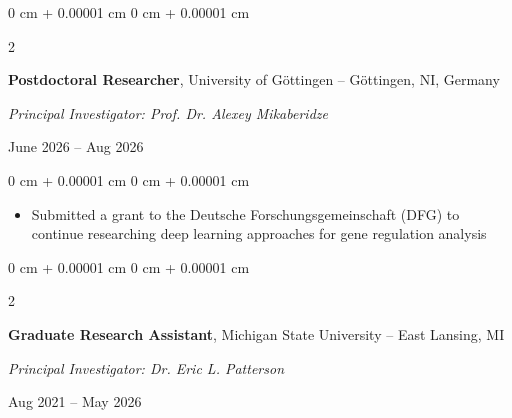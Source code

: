 \documentclass[10pt, letterpaper]{article}
\newenvironment{highlights}{
    \begin{itemize}[
        topsep=0.10 cm,
        parsep=0.10 cm,
        partopsep=0pt,
        itemsep=0pt,
        leftmargin=0 cm + 10pt
    ]
}{
    \end{itemize}
} %
\newenvironment{onecolentry}{
    \begin{adjustwidth}{
        0 cm + 0.00001 cm
    }{
        0 cm + 0.00001 cm
    }
}{
    \end{adjustwidth}
} %
\newenvironment{twocolentry}[2][]{
    \onecolentry
    \def\secondColumn{#2}
    \setcolumnwidth{\fill, 4.5 cm}
    \begin{paracol}{2}
}{
    \switchcolumn \raggedleft \secondColumn
    \end{paracol}
    \endonecolentry
} %
\begin{document}
        \vspace{0.2 cm}

        
         \begin{samepage}        
            \begin{twocolentry}{
                June 2026 – Aug 2026
                }
                \textbf{Postdoctoral Researcher}, University of Göttingen -- Göttingen, NI, Germany

                \vspace{0.05 cm}

                \textit{Principal Investigator: Prof. Dr. Alexey Mikaberidze}
            \end{twocolentry}
        \end{samepage}
        
        \vspace{0.10 cm}
        
        \begin{onecolentry}
            \begin{highlights}
                \item Submitted a grant to the Deutsche Forschungsgemeinschaft (DFG) to continue researching deep learning approaches for gene regulation analysis
            \end{highlights}
        \end{onecolentry}


        \vspace{0.2 cm}

        
        \begin{samepage}        
            \begin{twocolentry}{
                Aug 2021 – May 2026
                }
                \textbf{Graduate Research Assistant}, Michigan State University -- East Lansing, MI
                 
                \vspace{0.05 cm}

                \textit{Principal Investigator: Dr. Eric L. Patterson}
            \end{twocolentry}
        \end{samepage}
        
        \vspace{0.10 cm}
        
\end{document}
